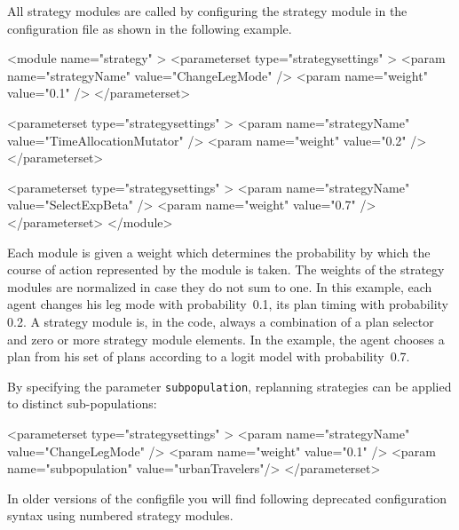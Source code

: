 All strategy modules are called by configuring the strategy module in the configuration file as shown in the following example.
%
\begin{xml}
<module name="strategy" >
	<parameterset type="strategysettings" >
		<param name="strategyName" value="ChangeLegMode" />
		<param name="weight" value="0.1" />
	</parameterset>
	
	<parameterset type="strategysettings" >
		<param name="strategyName" value="TimeAllocationMutator" />
		<param name="weight" value="0.2" />
	</parameterset>
	
	<parameterset type="strategysettings" >
		<param name="strategyName" value="SelectExpBeta" />
		<param name="weight" value="0.7" />
	</parameterset>
</module>
\end{xml}
%
Each module is given a weight which determines the probability by which the course of action represented by the module is taken. The weights of the strategy modules are normalized in case they do not sum to one. In this example, each agent changes his leg mode with probability~0.1, its plan timing with probability 0.2. A strategy module is, in the code, always a combination of a plan selector and zero or more strategy module elements. In the example, the agent chooses a plan from his set of plans according to a logit model with probability~0.7. 

By specifying the parameter \lstinline|subpopulation|, replanning strategies can be applied to distinct sub-populations: \eg
\begin{xml}
	<parameterset type="strategysettings" >
		<param name="strategyName" value="ChangeLegMode" />
		<param name="weight" value="0.1" />
		<param name="subpopulation" value="urbanTravelers"/>
	</parameterset>
\end{xml}

In older versions of the \gls{configfile} you will find following deprecated configuration syntax using numbered strategy modules.
%
%
%
%
%


